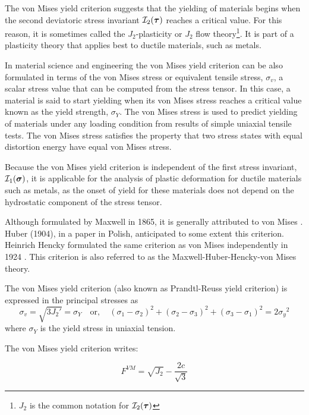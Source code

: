 The von Mises yield criterion suggests that the yielding of materials begins when the second 
deviatoric stress invariant ${\cal I}_2({\bm \tau})$ reaches a critical value. 
For this reason, it is sometimes called the $J_2$-plasticity or $J_2$ flow 
theory\footnote{$J_2$ is the common notation for ${\cal I}_2({\bm \tau})$}. 
It is part of a plasticity theory that applies best to ductile materials, such as metals. 

In material science and engineering the von Mises yield criterion can be also formulated in terms of 
the von Mises stress or equivalent tensile stress, $\sigma_v$, a scalar stress value that can be computed 
from the stress tensor. In this case, a material is said to start yielding when its von Mises stress 
reaches a critical value known as the yield strength, $\sigma_Y$. The von Mises stress is used to predict 
yielding of materials under any loading condition from results of simple uniaxial tensile tests. The 
von Mises stress satisfies the property that two stress states with equal distortion energy have equal 
von Mises stress. 

Because the von Mises yield criterion is independent of the first stress invariant, ${\cal I}_1({\bm \sigma})$, 
it is applicable 
for the analysis of plastic deformation for ductile materials such as metals, as the onset of yield for these materials does not depend on the hydrostatic component of the stress tensor. 

Although formulated by Maxwell in 1865, it is generally attributed to von Mises \cite{vonm13}. 
Huber (1904), in a paper in Polish, anticipated to some extent this criterion. 
Heinrich Hencky formulated the same criterion as von Mises independently in 1924 \cite{henc24,tata03}.
This criterion is also referred to as the Maxwell-Huber-Hencky-von Mises theory. 

The von Mises yield criterion (also known as Prandtl-Reuss yield criterion) is expressed in the principal stresses as
\[
\sigma_v=\sqrt{3J_2'} = \sigma_Y \quad \text{or}, \quad {(\sigma_1 - \sigma_2)^2 + (\sigma_2 - \sigma_3)^2 + (\sigma_3 - \sigma_1)^2 = 2 {\sigma_y}^2 }\!
\]
where $\sigma_Y$ is the yield stress in uniaxial tension.

The von Mises yield criterion writes:

\begin{mdframed}[backgroundcolor=blue!5]
\begin{equation}
F^{VM}= \sqrt{J_2} - \frac{2c}{\sqrt{3}}  \label{vmcrit}
\end{equation}
\end{mdframed}

